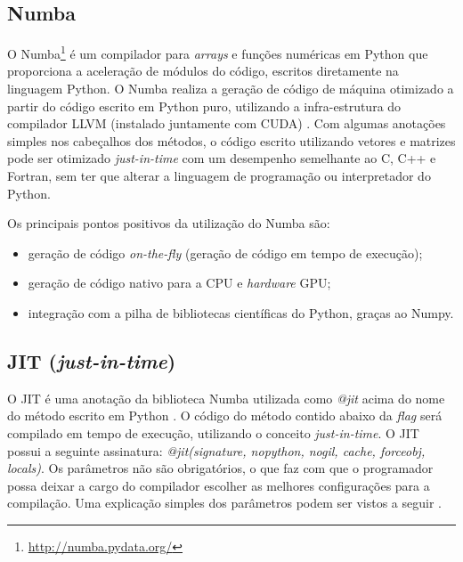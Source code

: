 \documentclass[
	12pt,				%
	twoside,			%
	a4paper,			%
	english,			%
	french,				%
	spanish,			%
	brazil				%
	]{abntex2}
\begin{document}
\subsection{Numba}\label{numba}

O Numba\footnote{\url{http://numba.pydata.org/}} é um compilador para
\emph{arrays} e funções numéricas em Python que proporciona a aceleração
de módulos do código, escritos diretamente na linguagem Python. O Numba
realiza a geração de código de máquina otimizado a partir do código
escrito em Python puro, utilizando a infra-estrutura do compilador LLVM
(instalado juntamente com CUDA) \cite{LAM}. Com algumas anotações
simples nos cabeçalhos dos métodos, o código escrito utilizando vetores
e matrizes pode ser otimizado \emph{just-in-time} com um desempenho
semelhante ao C, C++ e Fortran, sem ter que alterar a linguagem de
programação ou interpretador do Python.

Os principais pontos positivos da utilização do Numba são:

\begin{itemize}
\item
  geração de código \emph{on-the-fly} (geração de código em tempo de
  execução);
\item
  geração de código nativo para a CPU e \emph{hardware} GPU;
\item
  integração com a pilha de bibliotecas científicas do Python, graças ao
  Numpy.
\end{itemize}

\subsection{\texorpdfstring{JIT
(\emph{just-in-time})}{JIT (just-in-time)}}\label{jit-just-in-time}

O JIT é uma anotação da biblioteca Numba utilizada como \emph{@jit}
acima do nome do método escrito em Python \cite{RIGO}. O código do
método contido abaixo da \emph{flag} será compilado em tempo de
execução, utilizando o conceito \emph{just-in-time}. O JIT possui a
seguinte assinatura: \emph{@jit(signature, nopython, nogil, cache,
forceobj, locals)}. Os parâmetros não são obrigatórios, o que faz com
que o programador possa deixar a cargo do compilador escolher as
melhores configurações para a compilação. Uma explicação simples dos
parâmetros podem ser vistos a seguir \cite{NUMBA}.
\end{document}
